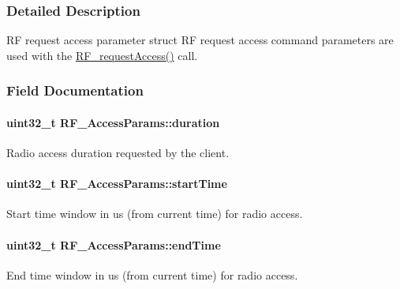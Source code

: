 \subsubsection{Detailed Description}
R\+F request access parameter struct R\+F request access command parameters are used with the \hyperlink{_r_f_8h_a40a5506c05a11a3cd9d379cedad5b5d0}{R\+F\+\_\+request\+Access()} call. 

\subsubsection{Field Documentation}
\paragraph[{duration}]{\setlength{\rightskip}{0pt plus 5cm}uint32\+\_\+t R\+F\+\_\+\+Access\+Params\+::duration}\label{struct_r_f___access_params_a0d6adb1c309962431a8b777a44325ade}


Radio access duration requested by the client. 

\paragraph[{start\+Time}]{\setlength{\rightskip}{0pt plus 5cm}uint32\+\_\+t R\+F\+\_\+\+Access\+Params\+::start\+Time}\label{struct_r_f___access_params_a4ec6ddde388c80d5e2d4b3d8311fcaaf}


Start time window in us (from current time) for radio access. 

\paragraph[{end\+Time}]{\setlength{\rightskip}{0pt plus 5cm}uint32\+\_\+t R\+F\+\_\+\+Access\+Params\+::end\+Time}\label{struct_r_f___access_params_ac15dd6465c631e5b2026ec34f6fc41b3}


End time window in us (from current time) for radio access. 

